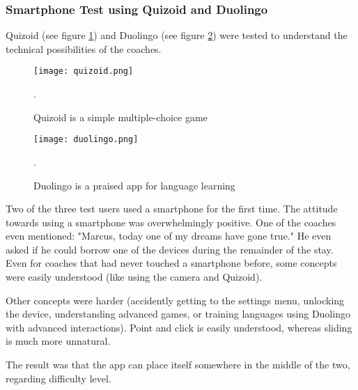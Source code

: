    \subsubsection{Smartphone Test using Quizoid and Duolingo}

    Quizoid (see figure \ref{fig:quizoid}) and Duolingo (see figure \ref{fig:duolingo}) were tested to understand the technical possibilities of the coaches.

    \begin{figure}[h]
        \centering
        \texttt{[image: quizoid.png]}
        \caption{Quizoid is a simple multiple-choice game \citep{quizoid}}.
        \label{fig:quizoid}
    \end{figure}

    \begin{figure}[h]
        \centering
        \texttt{[image: duolingo.png]}
        \caption{Duolingo is a praised app for language learning \citep{duolingo}}.
        \label{fig:duolingo}
    \end{figure}

    Two of the three test users used a smartphone for the first time. The attitude towards using a smartphone was overwhelmingly positive. One of the coaches even mentioned: "Marcus, today one of my dreams have gone true." He even asked if he could borrow one of the devices during the remainder of the stay. Even for coaches that had never touched a smartphone before, some concepts were easily understood (like using the camera and Quizoid).

    Other concepts were harder (accidently getting to the settings menu, unlocking the device, understanding advanced games, or training languages using Duolingo with advanced interactions). Point and click is easily understood, whereas sliding is much more unnatural.

    The result was that the app can place itself somewhere in the middle of the two, regarding difficulty level.
